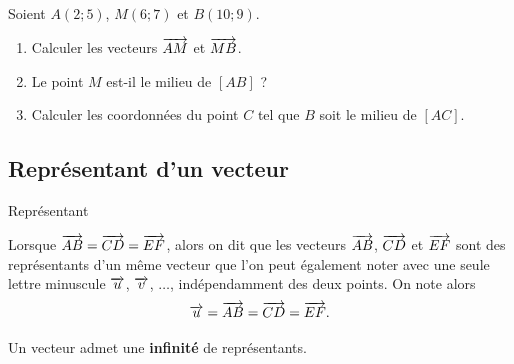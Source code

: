 \documentclass[11pt]{article}
\begin{document}
\begin{app}
  Soient $A(2; 5)$, $M(6; 7)$ et $B(10; 9)$.
  \begin{enumerate}
    \item Calculer les vecteurs $\overrightarrow{AM}$ et $\overrightarrow{MB}$.
    \item Le point $M$ est-il le milieu de $\left[ AB \right]$ ?
    \item Calculer les coordonnées du point $C$ tel que $B$ soit le milieu de
      $\left[ AC \right]$.
  \end{enumerate}
\end{app}

\subsection{Représentant d'un vecteur}
\begin{defi}{Représentant}
  \begin{minipage}[]{.5\textwidth}
    Lorsque $\overrightarrow{AB}=\overrightarrow{CD}=\overrightarrow{EF}$, alors on dit que les vecteurs
    $\overrightarrow{AB}$, $\overrightarrow{CD}$ et $\overrightarrow{EF}$ sont des représentants d'un même
    vecteur que l'on peut également noter avec une seule lettre minuscule $\overrightarrow{u}$, $\overrightarrow{v}$, $\ldots$, indépendamment des deux points. On note alors
    \[
    \overrightarrow{u}=\overrightarrow{AB}=\overrightarrow{CD}=\overrightarrow{EF}.
  \]
  \end{minipage}
  \begin{minipage}[]{.5\textwidth}
    \begin{center}
    \end{center}
  \end{minipage}
\end{defi}
\begin{rmq}
  Un vecteur admet une \textbf{infinité} de représentants.
\end{rmq}~\\[-15mm]
\end{document}
